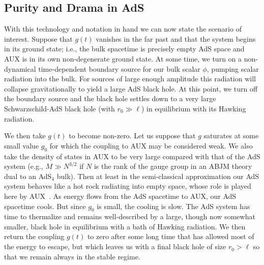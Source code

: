 \documentclass[12pt]{article}
\begin{document}
{{\subsection{Purity and Drama in AdS}


With this technology and notation in hand we can now state the scenario of interest.  Suppose that $g(t)$ vanishes in the far past and that the system begins in its ground state; i.e., the bulk spacetime is precisely empty AdS space and AUX is in its own non-degenerate ground state.  At some time, we turn on a non-dynamical time-dependent boundary source for our bulk scalar $\phi$, pumping scalar radiation into the bulk.  For sources of large enough amplitude this radiation will collapse gravitationally to yield a large AdS black hole.  At this point, we turn off the boundary source and the black hole settles down to a very large Schwarzschild-AdS black hole (with $r_0 \gg \ell$) in equilibrium with its Hawking radiation.

 We then take $g(t)$ to become non-zero.  Let us suppose that $g$ saturates at some small value $g_0$ for which the coupling to AUX may be considered weak.  We also take the density of states in AUX to be very large compared with that of the AdS system (e.g., $M \gg N^{3/2}$ if $N$ is the rank of the gauge group in an ABJM theory dual to an AdS${}_4$ bulk).  Then at least in the semi-classical approximation our AdS system behaves like a hot rock radiating into empty space, whose role is played here by AUX~\cite{Rocha:2008fe}.  As energy flows from the AdS spacetime to AUX, our AdS spacetime cools.  But since $g_0$ is small, the cooling is slow.  The AdS system has time to thermalize and remains well-described by a large, though now {somewhat} smaller, black hole in equilibrium with a bath of Hawking radiation.   We then return the coupling $g(t)$ to zero after some long time that has allowed most of the energy to escape, but which leaves us with a final black hole of size $r_0 > \ell$ so that we remain always in the stable regime.

}}
\end{document}
